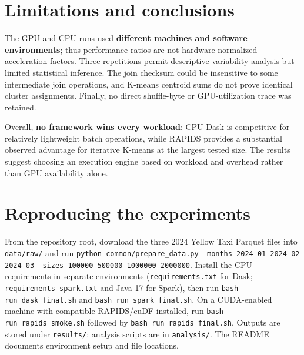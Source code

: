 \documentclass[9pt,a4paper]{extarticle}
\newcommand{\code}[1]{\texttt{#1}}
\begin{document}
\section{Limitations and conclusions}
The GPU and CPU runs used \textbf{different machines and software environments}; thus performance ratios are not hardware-normalized acceleration factors. Three repetitions permit descriptive variability analysis but limited statistical inference. The join checksum could be insensitive to some intermediate join operations, and K-means centroid sums do not prove identical cluster assignments. Finally, no direct shuffle-byte or GPU-utilization trace was retained.

Overall, \textbf{no framework wins every workload}: CPU Dask is competitive for relatively lightweight batch operations, while RAPIDS provides a substantial observed advantage for iterative K-means at the largest tested size. The results suggest choosing an execution engine based on workload and overhead rather than GPU availability alone.

\section{Reproducing the experiments}
From the repository root, download the three 2024 Yellow Taxi Parquet files into \code{data/raw/} and run \code{python common/prepare\_data.py --months 2024-01 2024-02 2024-03 --sizes 100000 500000 1000000 2000000}. Install the CPU requirements in separate environments (\code{requirements.txt} for Dask; \code{requirements-spark.txt} and Java 17 for Spark), then run \code{bash run\_dask\_final.sh} and \code{bash run\_spark\_final.sh}. On a CUDA-enabled machine with compatible RAPIDS/cuDF installed, run \code{bash run\_rapids\_smoke.sh} followed by \code{bash run\_rapids\_final.sh}. Outputs are stored under \code{results/}; analysis scripts are in \code{analysis/}. The README documents environment setup and file locations.
\end{document}

